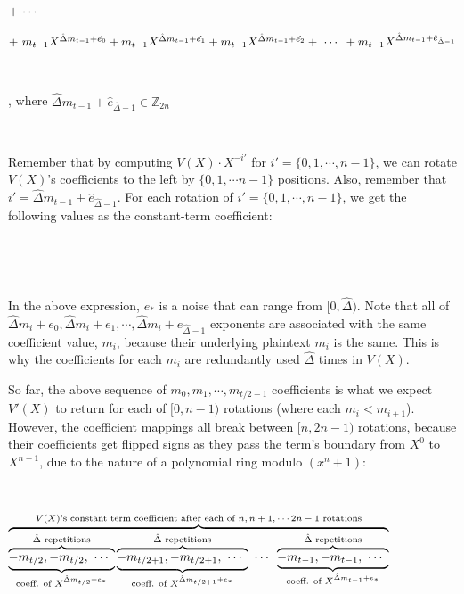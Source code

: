 \text{ } $ + \text{ } \text{$\cdots$} \text{ } $

\text{ } $ + \text{ } m_{t - 1}X^{\hat{\Delta} m_{t - 1} + \hat{e_0}} + m_{t - 1}X^{\hat{\Delta} m_{t - 1} + \hat{e_1}} + m_{t - 1}X^{\hat{\Delta} m_{t - 1} + \hat{e_2}} + \text{ } \text{$\cdots$} \text{ } + m_{t - 1}X^{\hat{\Delta} m_{t - 1} + \hat{e}_{\hat{\Delta} - 1}}$

$ $

\noindent , where $\hat{\Delta} m_{t - 1} + \hat{e}_{\hat{\Delta} - 1} \in \mathbb{Z}_{2n}$

$ $

Remember that by computing $V(X)\cdot X^{-i'}$ for  $i'= \{0, 1, \cdots , n-1\}$, we can rotate $V(X)$'s coefficients to the left by $\{0, 1, \cdots n-1 \}$ positions. Also, remember that $i' = \hat{\Delta} m_{t - 1} + \hat{e}_{\hat{\Delta} - 1}$. For each rotation of $i'= \{0, 1, \cdots , n-1\}$, we get the following values as the constant-term coefficient: 

$ $


$ $

In the above expression, $e_*$ is a noise that can range from $[0, \hat{\Delta})$. Note that all of $\hat\Delta m_i + e_0, \hat\Delta m_i + e_1, \cdots,\hat\Delta m_i + e_{\hat\Delta - 1}$ exponents are associated with the same coefficient value, $m_i$, because their underlying plaintext $m_i$ is the same. This is why the coefficients for each $m_i$ are redundantly used $\hat\Delta$ times in $V(X)$.

So far, the above sequence of $m_0, m_1, \cdots, m_{{t}/{2} - 1}$ coefficients is what we expect $V'(X)$ to return for each of $[0, n-1)$ rotations (where each $m_i < m_{i+1}$). However, the coefficient mappings all break between $[n, 2n -1)$ rotations, because their coefficients get flipped signs as they pass the term's boundary from $X^0$ to $X^{n-1}$, due to the nature of a polynomial ring modulo $(x^n + 1)$: 

$ $

$\overbrace{\overbrace{\underbrace{-m_{t/2}, -m_{t/2}, \text{ } \text{$\cdots$} \text{ }}_{\text{coeff. of } X^{\hat{\Delta}m_{t/2} + e_*}}}^{\hat{\Delta} \text{ repetitions}} \overbrace{\underbrace{-m_{t/2+1}, -m_{t/2+1}, \text{ } \text{$\cdots$} \text{ }}_{\text{coeff. of } X^{\hat{\Delta}m_{t/2+1} + e_*}}}^{\hat{\Delta} \text{ repetitions}} \text{ } \text{$\cdots$} \text{ } \overbrace{\underbrace{-m_{t - 1}, -m_{t - 1}, \text{ } \text{$\cdots$} \text{ }}_{\text{coeff. of } X^{\hat{\Delta}m_{t - 1}+ e_*} }}^{\hat{\Delta} \text{ repetitions}}}^{\text{$V(X)$'s constant term coefficient after each of $n, n+1, \cdots 2n-1$ rotations}}$ 

